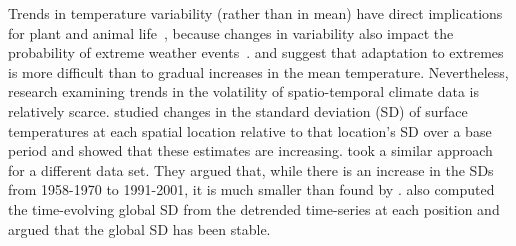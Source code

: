 \documentclass[ejs,noshowframe]{imsart}
\theoremstyle{plain}
\theoremstyle{definition}
\begin{document}


Trends in temperature variability (rather than in mean) have direct
implications for plant and animal life~\citep{huntingford_no_2013},
because changes in variability also impact the probability of extreme weather
events~\citep{VasseurDeLong2014}. 
\citet{hansen_perception_2012} and \citet{huntingford_no_2013}
suggest that adaptation to extremes is more difficult than
to gradual increases in the mean temperature. 
Nevertheless, research examining trends in the volatility of
spatio-temporal climate data is relatively scarce. 
\citet{hansen_perception_2012} studied
changes in 
the standard deviation (SD) of  surface temperatures
at each spatial location relative to that
location's SD over a base period and showed
that these estimates are increasing.
\citet{huntingford_no_2013} took a similar
approach for a different data set. They argued that, while there
is an increase in the SDs from 1958-1970 to 1991-2001, it
is much smaller than found by
\citet{hansen_perception_2012}. \citet{huntingford_no_2013} also computed the
time-evolving global SD from the detrended time-series at each
position and argued that the global SD has been
stable. 
\end{document}
